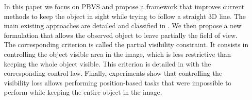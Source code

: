 \documentclass[letterpaper, 10 pt, conference]{IEEEtran}  %
\begin{document}
In this paper we focus on PBVS and propose a framework that improves current methods to keep the object in sight while trying to follow a straight 3D line. The main existing approaches are detailed and classified in .
We then propose a new formulation that allows the observed object to leave partially the field of view. 
The corresponding criterion is called the partial visibility constraint. It consists in controlling the object visible area in the image, which is less restrictive than keeping the whole object visible. This criterion is detailed in  with the corresponding control law.
Finally, experiments show that controlling the visibility loss allows performing position-based tasks that were impossible to perform while keeping the entire object in the image.

%
\end{document}
